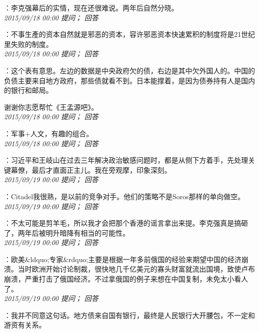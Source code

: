 \documentclass[twocolumn]{ctexart}
\begin{document}
：李克强幕后的实情，现在还很难说。两年后自然分晓。\\

\textit{\hfill\noindent\small 2015/09/18 00:00 提问； 回答}

：不事生產的资本自然就是邪恶的资本，容许邪恶资本快速累积的制度将是21世纪里失败的制度。\\

\textit{\hfill\noindent\small 2015/09/18 00:00 提问； 回答}

：这个表有意思。左边的数据是中央政府欠的债，右边是其中欠外国人的。中国的负债主要来自地方政府，那些债就看不到。日本能撑着，是因为债券持有人是国内的银行和邮局。

谢谢你志愿帮忙《王孟源吧》。\\

\textit{\hfill\noindent\small 2015/09/18 00:00 提问； 回答}

：军事+人文，有趣的组合。\\

\textit{\hfill\noindent\small 2015/09/18 00:00 提问； 回答}

：习近平和王岐山在过去三年解决政治敏感问题时，都是从侧下方着手，先处理关键幕僚，最后才直面正主儿。我在旁观摩，印象深刻。\\

\textit{\hfill\noindent\small 2015/09/19 00:00 提问； 回答}

：Citadel我很熟，是以前的竞争对手。他们的策略不是Soros那样的单向做空。\\

\textit{\hfill\noindent\small 2015/09/19 00:00 提问； 回答}

：不太可能是剪羊毛，所以我才会把那个香港的谣言拿出来提。李克强真是搞砸了，两年后被明升暗降有相当的可能性。\\

\textit{\hfill\noindent\small 2015/09/19 00:00 提问； 回答}

：欧美\&ldquo;专家\&rdquo;主要是根据一年多前俄国的经验来期望中国的经济崩溃。当时欧洲开始讨论制裁，很快地几千亿美元的寡头财富就流出国境，致使卢布崩溃，严重打击了俄国经济。不过拿俄国的例子来想在中国复制，未免太小看人了。\\

\textit{\hfill\noindent\small 2015/09/19 00:00 提问； 回答}

：我并不同意这句话。地方债来自国有银行，最终是人民银行大开腰包，不一定和游资有关系。\\
\end{document}
